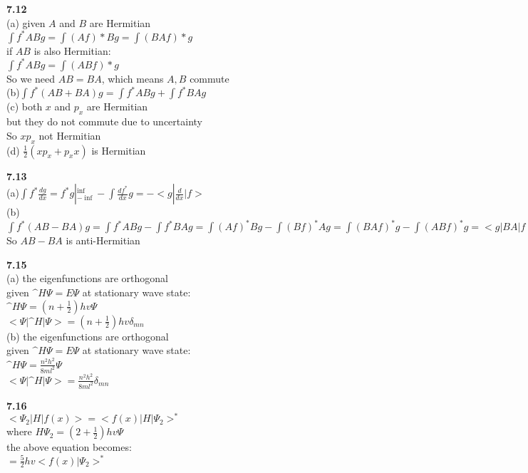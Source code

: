 \documentclass{article}
\begin{document}
\textbf{7.12}\\
(a) given $A$ and $B$ are Hermitian\\
$\int f^*ABg = \int (Af)*Bg = \int (BAf)*g$\\
if $AB$ is also Hermitian:\\
$\int f^*ABg = \int (ABf)*g$\\
So we need $AB = BA$, which means $A,B$ commute\\
(b)$\int f^*(AB+BA)g = \int f^*ABg + \int f^*BAg$\\
(c) both $x$ and $p_x$ are Hermitian\\
but they do not commute due to uncertainty\\
So $xp_x$ not Hermitian\\
(d) $\frac{1}{2}(xp_x+p_xx)$ is Hermitian\\
\newline

\textbf{7.13}\\
(a)$\int f^*\frac{dg}{dx} = f^*g|^{\inf}_{-\inf} - \int \frac{df^*}{dx}g = -<g|\frac{d}{dx}|f>$\\
(b)$\int f^*(AB-BA)g = \int f^*ABg - \int f^*BAg = \int (Af)^*Bg - \int (Bf)^*Ag = \int (BAf)^*g - \int (ABf)^*g = <g|BA|f>^* - <g|AB|f>^* = -<g|(AB-BA)|f>^*$\\
So $AB-BA$ is anti-Hermitian\\
\newline

\textbf{7.15}\\
(a) the eigenfunctions are orthogonal\\
given $\^{H}\Psi = E\Psi$ at stationary wave state:\\
$\^{H}\Psi = (n+\frac{1}{2})hv \Psi$\\
$<\Psi|\^{H}|\Psi> = (n + \frac{1}{2})hv\delta_{mn}$\\
(b) the eigenfunctions are orthogonal\\
given $\^{H}\Psi = E\Psi$ at stationary wave state:\\
$\^{H}\Psi = \frac{n^2h^2}{8ml^2}\Psi$\\
$<\Psi|\^{H}|\Psi> = \frac{n^2h^2}{8ml^2}\delta_{mn}$\\
\newline

\textbf{7.16}\\
$<\Psi_2|H|f(x)> = <f(x)|H|\Psi_2>^*$\\
where $H\Psi_2 = (2 + \frac{1}{2})hv\Psi$\\
the above equation becomes:\\
$= \frac{5}{2}hv<f(x)|\Psi_2>^*$\\
\newline
\end{document}
